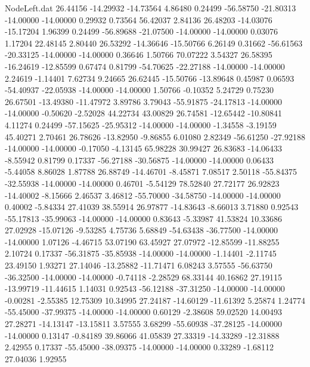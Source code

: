\begin{filecontents}{NodeLeft.dat}
  26.44156  -14.29932  -14.73564     4.86480    0.24499  -56.58750  -21.80313  -14.00000  -14.00000    0.29932    0.73564   56.42037    2.84136
  26.48203  -14.03076  -15.17204     1.96399    0.24499  -56.89688  -21.07500  -14.00000  -14.00000    0.03076    1.17204   22.48145    2.80440
  26.53292  -14.36646  -15.50766     6.26149    0.31662  -56.61563  -20.33125  -14.00000  -14.00000    0.36646    1.50766   70.07222    3.54327
  26.58395  -16.24619  -12.85599     0.67474    0.81799  -54.70625  -22.27188  -14.00000  -14.00000    2.24619   -1.14401    7.62734    9.24665
  26.62445  -15.50766  -13.89648     0.45987    0.06593  -54.40937  -22.05938  -14.00000  -14.00000    1.50766   -0.10352    5.24729    0.75230
  26.67501  -13.49380  -11.47972     3.89786    3.79043  -55.91875  -24.17813  -14.00000  -14.00000   -0.50620   -2.52028   44.22734   43.00829
  26.74581  -12.65442  -10.80841     4.11274    0.24499  -57.15625  -25.95312  -14.00000  -14.00000   -1.34558   -3.19159   45.40271    2.70461
  26.78626  -13.82950   -9.86855     6.01080    2.82349  -56.61250  -27.92188  -14.00000  -14.00000   -0.17050   -4.13145   65.98228   30.99427
  26.83683  -14.06433   -8.55942     0.81799    0.17337  -56.27188  -30.56875  -14.00000  -14.00000    0.06433   -5.44058    8.86028    1.87788
  26.88749  -14.46701   -8.45871     7.08517    2.50118  -55.84375  -32.55938  -14.00000  -14.00000    0.46701   -5.54129   78.52840   27.72177
  26.92823  -14.40002   -8.15666     2.46537    3.46812  -55.70000  -34.58750  -14.00000  -14.00000    0.40002   -5.84334   27.41039   38.55914
  26.97877  -14.83643   -8.66013     3.71880    0.92543  -55.17813  -35.99063  -14.00000  -14.00000    0.83643   -5.33987   41.53824   10.33686
  27.02928  -15.07126   -9.53285     4.75736    5.68849  -54.63438  -36.77500  -14.00000  -14.00000    1.07126   -4.46715   53.07190   63.45927
  27.07972  -12.85599  -11.88255     2.10724    0.17337  -56.31875  -35.85938  -14.00000  -14.00000   -1.14401   -2.11745   23.49150    1.93271
  27.14046  -13.25882  -11.71471     6.08243    3.57555  -56.63750  -36.32500  -14.00000  -14.00000   -0.74118   -2.28529   68.33144   40.16862
  27.19115  -13.99719  -11.44615     1.14031    0.92543  -56.12188  -37.31250  -14.00000  -14.00000   -0.00281   -2.55385   12.75309   10.34995
  27.24187  -14.60129  -11.61392     5.25874    1.24774  -55.45000  -37.99375  -14.00000  -14.00000    0.60129   -2.38608   59.02520   14.00493
  27.28271  -14.13147  -13.15811     3.57555    3.68299  -55.60938  -37.28125  -14.00000  -14.00000    0.13147   -0.84189   39.86066   41.05839
  27.33319  -14.33289  -12.31888     2.42955    0.17337  -55.45000  -38.09375  -14.00000  -14.00000    0.33289   -1.68112   27.04036    1.92955

\end{filecontents}
